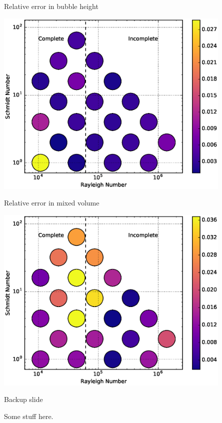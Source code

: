 \documentclass[12pt]{beamer}
\begin{document}
\begin{frame}[t]{Relative error in bubble height}
\begin{center}
\vspace{-11pt}
\includegraphics[width=0.85\textwidth]{graphics/DynamicsError-vs-Rayleigh-Schmidt.eps}
\end{center}
\end{frame}

\begin{frame}[t]{Relative error in mixed volume}
\begin{center}
\vspace{-11pt}
\includegraphics[width=0.85\textwidth]{graphics/MixingError-vs-Rayleigh-Schmidt.eps}
\end{center}
\end{frame}



\begin{frame}{Backup slide}

	Some stuff here.

\end{frame}

\end{document}
